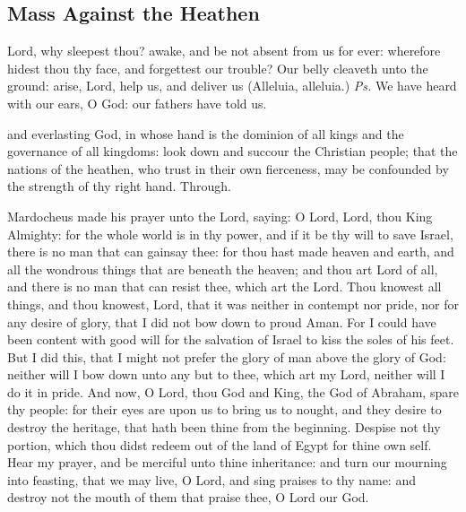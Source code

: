 \clearpage
\subsection{Mass Against the Heathen}

\introit
{} Lord, why sleepest thou? awake, and be not absent from us for ever: wherefore hidest thou thy face, and forgettest our trouble? Our belly cleaveth unto the ground: arise, Lord, help us, and deliver us (Alleluia, alleluia.) \textit{Ps.} We have heard with our ears, O God: our fathers have told us.

\collect
{} and everlasting God, in whose hand is the dominion of all kings and the governance of all kingdoms: look down and succour the Christian people; that the nations of the heathen, who trust in their own fierceness, may be confounded by the strength of thy right hand. Through.

 Mardocheus made his prayer unto the Lord, saying: O Lord, Lord, thou King Almighty: for the whole world is in thy power, and if it be thy will to save Israel, there is no man that can gainsay thee: for thou hast made heaven and earth, and all the wondrous things that are beneath the heaven; and thou art Lord of all, and there is no man that can resist thee, which art the Lord. Thou knowest all things, and thou knowest, Lord, that it was neither in contempt nor pride, nor for any desire of glory, that I did not bow down to proud Aman. For I could have been content with good will for the salvation of Israel to kiss the soles of his feet. But I did this, that I might not prefer the glory of man above the glory of God: neither will I bow down unto any but to thee, which art my Lord, neither will I do it in pride. And now, O Lord, thou God and King, the God of Abraham, spare thy people: for their eyes are upon us to bring us to nought, and they desire to destroy the heritage, that hath been thine from the beginning. Despise not thy portion, which thou didst redeem out of the land of Egypt for thine own self. Hear my prayer, and be merciful unto thine inheritance: and turn our mourning into feasting, that we may live, O Lord, and sing praises to thy name: and destroy not the mouth of them that praise thee, O Lord our God.


